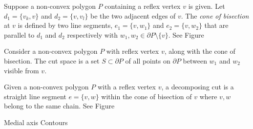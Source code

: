 \documentclass[../main.tex]{subfiles}
\begin{document}
\begin{definition}[Altitude]

\end{definition}

\begin{definition}
\label{def:cone_of_bisection}
Suppose a non-convex polygon $P$ containing a reflex vertex $v$ is given. Let $d_1=\{v_k, v\}$ and $d_2=\{v, v_l\}$ be the two adjacent edges of $v$. The \emph{cone of bisection} at $v$ is defined by two line segments, $e_1=\{v, w_1\}$ and $e_2=\{v, w_2\}$ that are parallel to $d_1$ and $d_2$ respectively with $w_1, w_2\in{\partial P\setminus\{v\}}$. See Figure%
\end{definition}

\begin{definition}
\label{def:cut_space}
Consider a non-convex polygon $P$ with reflex vertex $v$, along with the cone of bisection. The cut space is a set $S\subset\partial P$ of all points on $\partial P$ between $w_1$ and $w_2$ visible from $v$.
\end{definition}

\begin{definition}
\label{def:decomposing_cut}
Given a non-convex polygon $P$ with a reflex vertex $v$, a decomposing cut is a straight line segment $e=\{v,w\}$ within the cone of bisection of $v$ where $v,w$ belong to the same chain. See Figure~%
\end{definition}

Medial axis
Contours
\end{document}
